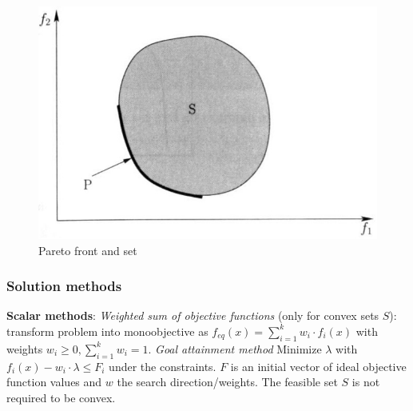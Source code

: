 \begin{figure}
    \centering
    \includegraphics{img/pareto.jpg}
    \caption{Pareto front and set}
    \label{fig:pareto}
\end{figure}

\subsubsection*{Solution methods}
\textbf{Scalar methods}: 
\textit{Weighted sum of objective functions} (only for convex sets $S$): transform problem into monoobjective as $f_{eq}(x) = \sum_{i=1}^k w_i \cdot f_i(x)$ with weights $w_i \geq 0, \sum_{i=1}^k w_i = 1$. 
\textit{Goal attainment method} 
Minimize $\lambda$ with $f_i (x) - w_i \cdot \lambda \leq F_i$ under the constraints. 
$F$ is an initial vector of ideal objective function values and $w$ the search direction/weights. 
The feasible set $S$ is not required to be convex.

